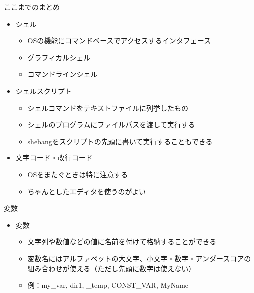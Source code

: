 \documentclass[12pt,aspectratio=169]{beamer}
\begin{document}
\begin{frame}{ここまでのまとめ}

  \begin{itemize}
    \item シェル
      \begin{itemize}
        \item OSの機能にコマンドベースでアクセスするインタフェース
        \item グラフィカルシェル
        \item コマンドラインシェル
      \end{itemize}
    \item シェルスクリプト
      \begin{itemize}
        \item シェルコマンドをテキストファイルに列挙したもの
        \item シェルのプログラムにファイルパスを渡して実行する
        \item shebangをスクリプトの先頭に書いて実行することもできる
      \end{itemize}
    \item 文字コード・改行コード
      \begin{itemize}
        \item OSをまたぐときは特に注意する
        \item ちゃんとしたエディタを使うのがよい
      \end{itemize}

  \end{itemize}


\end{frame}


\begin{frame}{変数}
  \begin{itemize}
    \item 変数
      \begin{itemize}
        \item 文字列や数値などの値に名前を付けて格納することができる
        \item 変数名にはアルファベットの大文字、小文字・数字・アンダースコアの組み合わせが使える（ただし先頭に数字は使えない）
        \item 例：my\_var, dir1, \_temp, CONST\_VAR, MyName
      \end{itemize}

  \end{itemize}

\end{frame}
\end{document}
